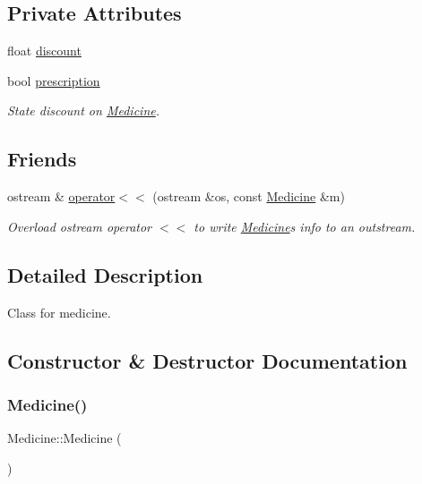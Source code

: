 \subsection*{Private Attributes}
\begin{DoxyCompactItemize}
\item 
float \hyperlink{classMedicine_a56e42f35d8edce81983df5837b6fee54}{discount}
\item 
bool \hyperlink{classMedicine_a10737b485d7f6e8b208ae5e26299333d}{prescription}
\begin{DoxyCompactList}\small\item\em State discount on \hyperlink{classMedicine}{Medicine}. \end{DoxyCompactList}\end{DoxyCompactItemize}
\subsection*{Friends}
\begin{DoxyCompactItemize}
\item 
ostream \& \hyperlink{classMedicine_ac59d59dad83c5b44d752d0dc6bdbf845}{operator$<$$<$} (ostream \&os, const \hyperlink{classMedicine}{Medicine} \&m)
\begin{DoxyCompactList}\small\item\em Overload ostream operator $<$$<$ to write \hyperlink{classMedicine}{Medicine}\textquotesingle{}s info to an outstream. \end{DoxyCompactList}\end{DoxyCompactItemize}


\subsection{Detailed Description}
Class for medicine. 

\subsection{Constructor \& Destructor Documentation}
\mbox{\label{classMedicine_a6a879be6fb9f5b9b16b465a5aff3f835}} 
\subsubsection{\texorpdfstring{Medicine()}{Medicine()}\hspace{0.1cm}{\footnotesize\ttfamily [1/2]}}
{\footnotesize\ttfamily Medicine\+::\+Medicine (\begin{DoxyParamCaption}{ }\end{DoxyParamCaption})}



